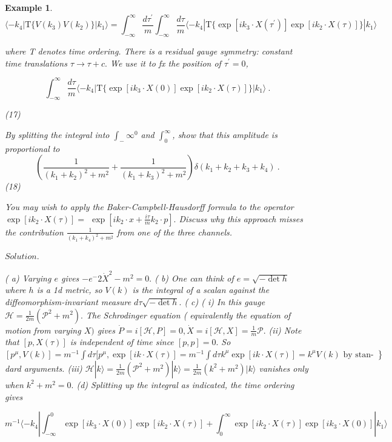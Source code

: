 \documentclass[10pt,
 article,
 amsmath,amssymb
]{revtex4-2}
\newtheorem{example}[theorem]{Example}
\begin{document}
\begin{example}
$$\langle-k_4|\mathrm{T}\big\{V(k_3)V(k_2)\big\}|k_1\rangle=\int_{-\infty}^\infty\frac{d\tau^{\prime}}m\int_{-\infty}^\infty\frac{d\tau}m\langle-k_4|\mathrm{T}\big\{\exp\left[ik_3\cdot X(\tau^{\prime})\right]\exp\left[ik_2\cdot X(\tau)\right]\big\}|k_1\rangle $$


where T denotes time ordering.
There is a residual gauge symmetry: constant time translations $\tau\to\tau+c.$ We use it to fx
the position of $\tau^\prime=0$,

$$\int_{-\infty}^\infty\frac{d\tau}m\langle-k_4|\mathrm{T}\big\{\exp\left[ik_3\cdot X(0)\right]\exp\left[ik_2\cdot X(\tau)\right]\big\}|k_1\rangle\:.$$

(17)

By splitting the integral into $\int_-\infty^0$ and $\int_0^\infty$, show that this amplitude is proportional to
$$\left(\frac1{(k_1+k_2)^2+m^2}+\frac1{(k_1+k_3)^2+m^2}\right)\delta(k_1+k_2+k_3+k_4)\:.$$
(18)


You may wish to apply the Baker-Campbell-Hausdorff formula to the operator $\exp\left[ik_2\cdot X(\tau)\right]=$
$\exp\left[ik_2\cdot x+\frac{i\tau}mk_2\cdot p\right].$
Discuss why this approach misses the contribution $\frac1{(k_1+k_4)^2+m^2}$ from one of the three channels.

$\textit{Solution. }$

( a) Varying $e$ gives $-e^-2\dot{X}^2-m^2=0.$
( b) One can think of $e= \sqrt {- \det h}$ where $h$ is a 1d metric, so $V(k)$ is the integral of a scalan
against the diffeomorphism-invariant measure $d\tau\sqrt{-\det h}.$
( c) ( i) In this gauge $\mathcal{H} = \frac 1{2m}( \mathcal{P} ^2+ m^2) .$ The Schrodinger equation ( equivalently the equation
of motion from varying $X)$ gives $\dot{P}=i[\mathcal{H},P]=0,\dot{X}=i[\mathcal{H},X]=\frac1m\mathcal{P}.$
(ii) Note that $[p,X(\tau)]$ is independent of time since $[p,p]=0.$
So $[p^\mu,V(k)]=m^{-1}\int d\tau[p^\mu,\exp\left[ik\cdot X(\tau)\right]=m^{-1}\int d\tau\left.k^\mu\exp\left[ik\cdot X(\tau)\right]=k^\mu V(k)\text{ by stan- }\right\}$
dard arguments.
(iii) $\mathcal{H}|k\rangle=\frac1{2m}(\mathcal{P}^2+m^2)|k\rangle=\frac1{2m}(k^2+m^2)|k\rangle$ vanishes only when $k^2+m^2=0.$
(d) Splitting up the integral as indicated, the time ordering gives

$$m^{-1}\langle-k_4|\int_{-\infty}^0\exp\left[ik_3\cdot X(0)\right]\exp\left[ik_2\cdot X(\tau)\right]+\int_0^\infty\exp\left[ik_2\cdot X(\tau)\right]\exp\left[ik_3\cdot X(0)\right]|k_1\rangle $$


\end{example}
\end{document}
